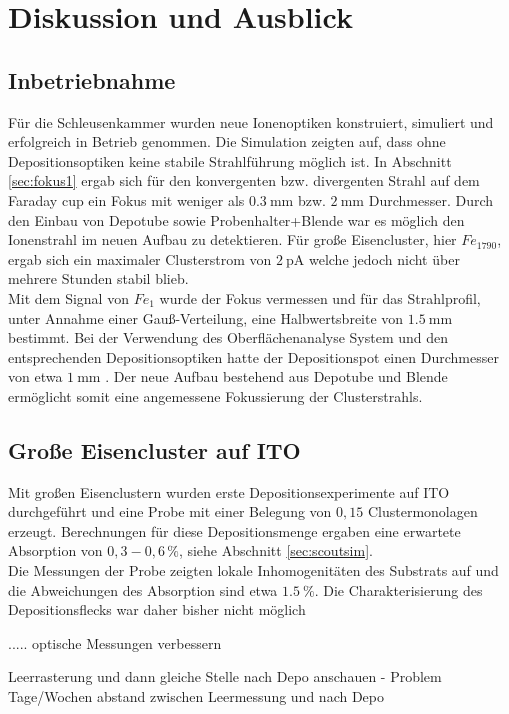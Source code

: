 \chapter{Diskussion und Ausblick}
\section{Inbetriebnahme}
Für die Schleusenkammer wurden neue Ionenoptiken konstruiert, simuliert und erfolgreich in Betrieb genommen.
Die Simulation zeigten auf, dass ohne Depositionsoptiken keine stabile Strahlführung möglich ist.
In Abschnitt \ref{sec:fokus1} ergab sich für den konvergenten bzw. divergenten Strahl auf dem Faraday cup ein Fokus mit weniger als $\SI{0,3}{\mm}$ bzw. $\SI{2}{\mm}$ Durchmesser.
Durch den Einbau von Depotube sowie Probenhalter+Blende war es möglich den Ionenstrahl im neuen Aufbau zu detektieren.
Für große Eisencluster, hier $Fe_{1790}$, ergab sich ein maximaler Clusterstrom von $\SI{2}{\pA}$ welche jedoch nicht über mehrere Stunden stabil blieb.\\
Mit dem Signal von $Fe_1$ wurde der Fokus vermessen und für das Strahlprofil, unter Annahme einer Gauß-Verteilung, eine Halbwertsbreite von $\SI{1,5}{\milli\meter}$ bestimmt.
Bei der Verwendung des Oberflächenanalyse System und den entsprechenden Depositionsoptiken hatte der Depositionspot einen Durchmesser von etwa $\SI{1}{\mm}$ \cite[S. 40]{gronhagen}.
Der neue Aufbau bestehend aus Depotube und Blende ermöglicht somit eine angemessene Fokussierung der Clusterstrahls.
\section{Große Eisencluster auf ITO}
Mit großen Eisenclustern wurden erste Depositionsexperimente auf ITO durchgeführt und eine Probe mit einer Belegung von $0,15$ Clustermonolagen erzeugt.
Berechnungen für diese Depositionsmenge ergaben eine erwartete Absorption von $0,3 - 0,6\,\%$, siehe Abschnitt \ref{sec:scoutsim}.\\
Die Messungen der Probe zeigten lokale Inhomogenitäten des Substrats auf und die Abweichungen des Absorption sind etwa $\SI{1.5}{\%}$.
Die Charakterisierung des Depositionsflecks war daher bisher nicht möglich

.....
optische Messungen verbessern

Leerrasterung und dann gleiche Stelle nach Depo anschauen - Problem Tage/Wochen abstand zwischen Leermessung und nach Depo

